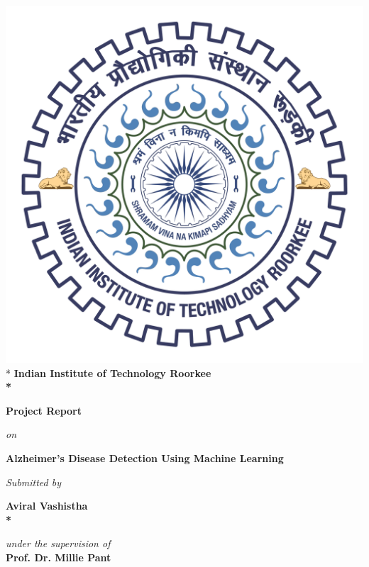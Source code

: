 \documentclass[a4paper,12pt]{report}
\begin{document}
\title{}
\begin{center}
\thispagestyle{empty}
 \includegraphics[scale=0.085]{logo.pdf}\\*
\Large\bfseries{Indian Institute of Technology Roorkee}\\*
\vspace{1.5cm}
\end{center}
\begin{center}
\Large\bfseries{Project Report}
\end{center}
\begin{center}
\textit{on}
\end{center}
\begin{center}
\Large\bfseries{Alzheimer's Disease Detection Using Machine Learning}
\end{center}
\begin{center}
\textit{Submitted by}
\end{center}
\begin{center}
\Large\bfseries{Aviral Vashistha}\\*
\end{center}
\begin{center}
\textit{under the supervision of}\\
\Large\bfseries{Prof. Dr.  Millie Pant}\\
\end{center}
\end{document}
